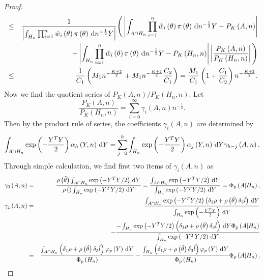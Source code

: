 \begin{thm}
\begin{proof}
\begin{eqnarray}
 & \le & \frac{1}{\left|\int_{H_{n}}\prod_{i=1}^{n}\hat{w}_{i}\left(\theta\right)\pi\left(\theta\right)\,\mathrm{d} n^{-\frac{1}{2}}Y\right|}\Bigg(\left|\int_{A\cap H_{n}}\prod_{i=1}^{n}\hat{w}_{i}\left(\theta\right)\pi\left(\theta\right)\,\mathrm{d} n^{-\frac{1}{2}}Y-P_{K}\left(A,n\right)\right|\nonumber \\
 &  & +\left|\int_{H_{n}}\prod_{i=1}^{n}\hat{w}_{i}\left(\theta\right)\pi\left(\theta\right)\,\mathrm{d} n^{-\frac{1}{2}}Y-P_{K}\left(H_{n},n\right)\right|\left|\frac{P_{K}\left(A,n\right)}{P_{K}\left(H_{n},n\right)}\right|\Bigg)\nonumber \\
 & \le & \frac{1}{C_{1}}\left(M_{1}n^{-\frac{K+2}{2}}+M_{1}n^{-\frac{K+2}{2}}\frac{C_{2}}{C_{1}}\right)=\frac{M_{1}}{C_{1}}\left(1+\frac{C_{1}}{C_{2}}\right)n^{-\frac{K+2}{2}}.\label{eq:two-quotient-close}
\end{eqnarray}
Now we find the quotient series of $P_{K}\left(A,n\right)/P_{K}\left(H_{n},n\right)$.
Let 
\[
\frac{P_{K}\left(A,n\right)}{P_{K}\left(H_{n},n\right)}=\sum_{i=0}^{\infty}\gamma_{i}\left(A,n\right)n^{-\frac{i}{2}}.
\]
Then by the product rule of series, the coefficients $\gamma_{i}\left(A,n\right)$
are determined by 
\[
\int_{A\cap H_{n}}\exp\left(-\frac{Y^{T}Y}{2}\right)\alpha_{h}\left(Y,n\right)\,\mathrm{d} Y=\sum_{j=0}^{h}\int_{H_{n}}\exp\left(-\frac{Y^{T}Y}{2}\right)\alpha_{j}\left(Y,n\right)\,\mathrm{d} Y\gamma_{h-j}\left(A,n\right).
\]
Through simple calculation, we find first two items of $\gamma_{i}\left(A,n\right)$
as
\begin{eqnarray*}
\gamma_{0}\left(A,n\right) & = & \frac{\rho\left(\tilde{\theta}\right)\int_{A\cap H_{n}}\exp\left(-{Y^{T}Y}/{2}\right)\diff Y}{\rho\left(\right)\int_{H_{n}}\exp\left(-{Y^{T}Y}/{2}\right)\diff Y}=\frac{\int_{A\cap H_{n}}\exp\left(-{Y^{T}Y}/{2}\right)\diff Y}{\int_{H_{n}}\exp\left(-{Y^{T}Y}/{2}\right)\diff Y}=\Phi_{p}\left(A|H_{n}\right),\\
\gamma_{1}\left(A,n\right) & = & \frac{\int_{A\cap H_{n}}\exp\left(-{Y^{T}Y}/{2}\right)\left(\delta_{1}\rho+\rho\left(\tilde{\theta}\right)\delta_{3}\tilde{l}\right)\diff Y}{\int_{H_{n}}\exp\left(-\frac{Y^{T}Y}{2}\right)\diff Y}\\
 &  & -\frac{-\int_{H_{n}}\exp\left(-{Y^{T}Y}/{2}\right)\left(\delta_{1}\rho+\rho\left(\tilde{\theta}\right)\delta_{3}\hat{l}\right)\diff Y\Phi_{p}\left(A|H_{n}\right)}{\int_{H_{n}}\exp\left(-{Y^{T}Y}/{2}\right)\diff Y}\\
 & = & \frac{\int_{A\cap H_{n}}\left(\delta_{1}\rho+\rho\left(\tilde{\theta}\right)\delta_{3}\hat{l}\right)\varphi_{p}\left(Y\right)\diff Y}{\Phi_{p}\left(H_{n}\right)}-\frac{\int_{H_{n}}\left(\delta_{1}\rho+\rho\left(\tilde{\theta}\right)\delta_{3}\hat{l}\right)\varphi_{p}\left(Y\right)\diff Y}{\Phi_{p}\left(H_{n}\right)}\Phi_{p}\left(A|H_{n}\right),

\end{eqnarray*}
\end{proof}
\end{thm}
